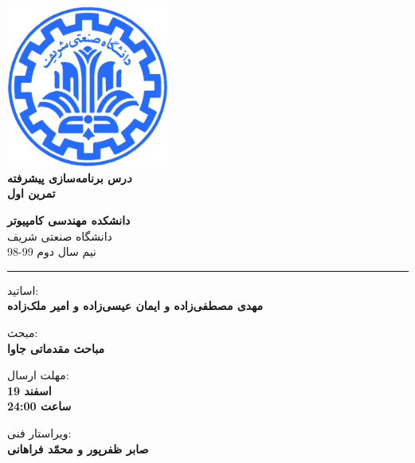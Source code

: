 \documentclass[]{article}
\begin{document}
\begin{titlepage}
\begin{center}
        
\vspace*{0.7cm}

\includegraphics[width=0.4\textwidth]{sharif1.png}\\
\vspace{0.5cm}
\textbf{ \Huge{\emph درس برنامه‌سازی پیشرفته} }\\
\vspace{0.5cm}
\textbf{ \Large{ تمرین اول} }
\vspace{0.2cm}
       
 
      \large \textbf{دانشکده مهندسی کامپیوتر}\\\vspace{0.2cm}
    \large   دانشگاه صنعتی شریف\\\vspace{0.2cm}
       \large   ﻧﯿﻢ سال دوم 99-98 \\\vspace{0.2cm}
      \noindent\rule[1ex]{\linewidth}{1pt}
اساتید:\\
    \textbf{{مهدی مصطفی‌زاده و ایمان عیسی‌زاده و امیر ملک‌زاده}}

    \vspace{0.20cm}
    مبحث:\\
    \textbf{{مباحث مقدماتی جاوا}}

    \vspace{0.20cm}

   مهلت ارسال:\\
    \textbf{{19 اسفند}}\\
    \textbf{{ساعت 24:00}}

    \vspace{0.15cm}
ویراستار فنی:\\
    \textbf{{صابر ظفر‌پور و محمّد فراهانی}}
\end{center}
\end{titlepage}
\end{document}
